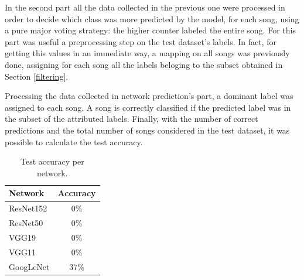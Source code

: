 \documentclass[10pt,twocolumn,letterpaper]{article}
\begin{document}
In the second part all the data collected in the previous one were processed in order to decide which class was more predicted by the model, for each song, using a pure major voting strategy: the higher counter labeled the entire song. For this part was useful a preprocessing step on the test dataset's labels. In fact, for getting this values in an immediate way, a mapping on all songs was previously done, assigning for each song all the labels beloging to the subset obtained in Section \ref{filtering}.

Processing the data collected in network prediction's part, a dominant label was assigned to each song. A song is correctly classified if the predicted label was in the subset of the attributed labels. Finally, with the number of correct predictions and the total number of songs considered in the test dataset, it was possible to calculate the test accuracy.



   \begin{table}[ht]
      \begin{center}
      \def\arraystretch{1.5}
      \begin{tabular}{l|c}
         \textbf{Network} & \textbf{Accuracy} \\
      \hline
      ResNet152 & 0\%  \\
      \hline
      ResNet50 & 0\%  \\
      \hline
      VGG19 & 0\% \\
      \hline
      VGG11 & 0\% \\
      \hline
      GoogLeNet & 37\% \\
      \end{tabular}
      \end{center}
      \caption{Test accuracy per network.}
      \label{tab:test}
      \end{table}
\end{document}

